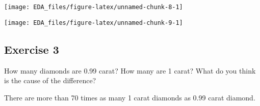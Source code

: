 \documentclass[]{book}
\newenvironment{Shaded}{\begin{snugshade}}{\end{snugshade}}
\newcommand{\CommentTok}[1]{\textcolor[rgb]{0.56,0.35,0.01}{\textit{#1}}}
\newcommand{\DataTypeTok}[1]{\textcolor[rgb]{0.13,0.29,0.53}{#1}}
\newcommand{\DecValTok}[1]{\textcolor[rgb]{0.00,0.00,0.81}{#1}}
\newcommand{\FloatTok}[1]{\textcolor[rgb]{0.00,0.00,0.81}{#1}}
\newcommand{\KeywordTok}[1]{\textcolor[rgb]{0.13,0.29,0.53}{\textbf{#1}}}
\newcommand{\NormalTok}[1]{#1}
\newcommand{\OperatorTok}[1]{\textcolor[rgb]{0.81,0.36,0.00}{\textbf{#1}}}
\newcommand{\StringTok}[1]{\textcolor[rgb]{0.31,0.60,0.02}{#1}}
\theoremstyle{plain}
\theoremstyle{remark}
\theoremstyle{definition}
\theoremstyle{definition}
\theoremstyle{definition}
\theoremstyle{remark}
\begin{document}
\begin{center}\texttt{[image: EDA\_files/figure-latex/unnamed-chunk-8-1]} \end{center}

\begin{Shaded}
\end{Shaded}

\begin{center}\texttt{[image: EDA\_files/figure-latex/unnamed-chunk-9-1]} \end{center}

\hypertarget{exercise-3-11}{%
\subsection{Exercise 3}\label{exercise-3-11}}

How many diamonds are 0.99 carat? How many are 1 carat? What do you
think is the cause of the difference?

There are more than 70 times as many 1 carat diamonds as 0.99 carat
diamond.

\begin{Shaded}
\end{Shaded}
\end{document}
